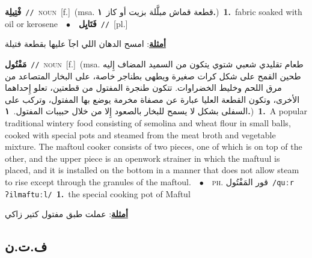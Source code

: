 \documentclass[10pt,a4paper,twoside]{article} %
\begin{document}
\begin{multicols}{2}
{\setlength\topsep{0pt}\textbf{\foreignlanguage{arabic}{فْتِيلِة}}\ {\color{gray}\texttt{//}\color{black}}\ \textsc{noun}\ [f.]\ \color{gray}(msa. \foreignlanguage{arabic}{قطعة قماش مبلَّلة بزيت أو كاز}~\foreignlanguage{arabic}{\textbf{١.}})\color{black}\ \textbf{1.}~fabric soaked with oil or kerosene\ \ $\bullet$\ \ \setlength\topsep{0pt}\textbf{\foreignlanguage{arabic}{فَتَايِل}}\ {\color{gray}\texttt{//}\color{black}}\ [pl.]\  \begin{flushright}\color{gray}\foreignlanguage{arabic}{\textbf{\underline{\foreignlanguage{arabic}{أمثلة}}}: امسح الدهان اللي اجآ عليها بقطعة فتيلة}\end{flushright}\color{black}} \vspace{2mm}

{\setlength\topsep{0pt}\textbf{\foreignlanguage{arabic}{مَفْتُول}}\ {\color{gray}\texttt{//}\color{black}}\ \textsc{noun}\ [f.]\ \color{gray}(msa. \foreignlanguage{arabic}{طعام تقليدي شعبي شتوي يتكون من السميد المضاف إِليه طحين القمح على شكل كرات صغيرة ويطهى بطناجر خاصة، على البخار المتصاعد من مرق اللحم وخليط الخضراوات. تتكون طنجرة المفتول من قطعتين، تعلو إِحداهما الأخرى، وتكون القطعة العليا عبارة عن مصفاة مخرمة يوضع بها المفتول، وتركب على السفلى بشكل لا يسمح للبخار بالصعود إِلا من خلال حبيبات المفتول.}~\foreignlanguage{arabic}{\textbf{١.}})\color{black}\ \textbf{1.}~A popular traditional wintery food consisting of semolina and wheat flour in small balls, cooked with special pots and steamed from the meat broth and vegetable mixture. The maftoul cooker consists of two pieces, one of which is on top of the other, and the upper piece is an openwork strainer in which the maftuul is placed, and it is installed on the bottom in a manner that does not allow steam to rise except through the granules of the maftoul.\ \ $\bullet$\ \ \textsc{ph.} \color{gray} \foreignlanguage{arabic}{قور المَفْتُول}\color{black}\ {\color{gray}\texttt{/{\sffamily quːr ʔilmaftuːl}/}\color{black}}\ \textbf{1.}~the special cooking pot of Maftul\  \begin{flushright}\color{gray}\foreignlanguage{arabic}{\textbf{\underline{\foreignlanguage{arabic}{أمثلة}}}: عملت طبق مفتول كتير زاكي}\end{flushright}\color{black}} \vspace{2mm}

\vspace{-3mm}
\subsection*{\color{blue}\foreignlanguage{arabic}{ف.ت.ن}\color{blue}{}} 


\end{multicols}
\end{document}
